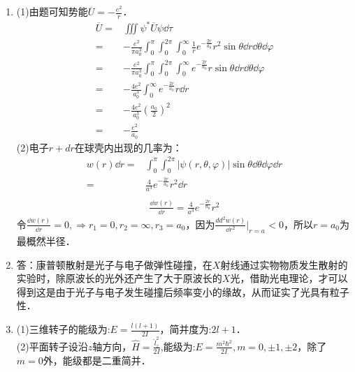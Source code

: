 
\begin{issues}
\issueDraft
\end{issues}


\subsection{ }
\begin{enumerate}
\item 
(1)由题可知势能$\overline{U}=-\frac{e^2}{r}$．
\begin{equation}
\begin{aligned}
\overline{U}=&\iiint \psi^{*} \overline{U} \psi \dd{\tau}\\
=&-\frac{e^2}{\pi a^{3}_{0}}\int^{\pi}_{0}\int^{2\pi}_{0}\int^{\infty}_{0} \frac{1}{r}e^{-\frac{2r}{a_0}}r^{2}\sin{\theta} \dd{r}\dd{\theta}\dd{\varphi}\\
=&-\frac{e^{2}}{\pi a^{3}_{0}}\int^{\pi}_{0}\int^{2\pi}_{0}\int^{\infty}_{0} e^{-\frac{2r}{a_0}}r\sin{\theta} \dd{r}\dd{\theta}\dd{\varphi}\\
=&-\frac{4 e^2}{a^{3}_{0}}\int^{\infty}_{0}e^{-\frac{2r}{a_0}}r\dd{r}\\
=&-\frac{4e^{2}}{a^{3}_{0}}(\frac{a_{0}}{2})^2\\
=&-\frac{e^{2}}{a_{0}}
\end{aligned}
\end{equation}
(2)电子$r+dr$在球壳内出现的几率为：\\
\begin{equation}
\begin{aligned}
w(r)\dd{r}=&\int^{\pi}_{0}\int^{2\pi}_{0} \lvert \psi(r,\theta,\varphi) \rvert \sin{\theta}\dd{\theta}\dd{\varphi}\dd{r}\\
=&\frac{4}{a^{3}}e^{-\frac{2r}{a_0}}r^2 \dd{r}\\
\end{aligned}
\end{equation}
\begin{equation}
\begin{aligned}
\frac{\dd{w(r)}}{\dd{r}}=\frac{4}{a^{3}}e^{-\frac{2r}{a_0}}r^2 
\end{aligned}
\end{equation}
令$\frac{\dd{w(r)}}{\dd{r}}=0,\Longrightarrow r_1 = 0,r_2 = \infty,r_3 = a_0$，因为$\frac{dd^{2}{w(r)}}{\dd{r^{2}}}|_{r = a_{}} < 0$，所以$r = a_0$为最概然半径．

\item
答：康普顿散射是光子与电子做弹性碰撞，在$X$射线通过实物物质发生散射的实验时，除原波长的光外还产生了大于原波长的$X$光，借助光电理论，才可以得到这是由于光子与电子发生碰撞后频率变小的缘故，从而证实了光具有粒子性．

\item 
(1)三维转子的能级为:$E = \frac{l(l+1)}{2I}$，简并度为:$2l+1$．\\
(2)平面转子设沿$z$轴方向，$\hat{H} = \frac{\hat{l}^{2}_{z}}{2I}$,能级为:$E = \frac{m^{2} \hbar^{2}}{2I} ,m = 0 , \pm 1 , \pm 2$，除了$m = 0$外，能级都是二重简并．
\end{enumerate}

